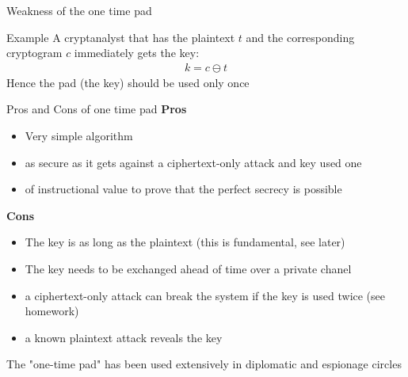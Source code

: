 \begin{parag}{Weakness of the one time pad}
    \begin{subparag}{Example}
        A cryptanalyst that has the plaintext $t$ and the corresponding cryptogram $c$ immediately gets the key:
        \begin{align*}
            k = c \ominus t
        \end{align*}
        Hence the pad (the key) should be used only once
    \end{subparag}
    \begin{subparag}{Pros and Cons of one time pad}
        \textbf{Pros}
        \begin{itemize}
            \item Very simple algorithm
            \item as secure as it gets against a ciphertext-only attack and key used one
            \item of instructional value to prove that the perfect secrecy is possible
        \end{itemize}
        \textbf{Cons}
        \begin{itemize}
            \item The key is as long as the plaintext (this is fundamental, see later)
            \item The key needs to be exchanged ahead of time over a private chanel
            \item a ciphertext-only attack can break the system if the key is used twice (see homework)
            \item a known plaintext attack reveals the key
        \end{itemize}
        The "one-time pad" has been used extensively in diplomatic and espionage circles
        
    \end{subparag}

\end{parag}
